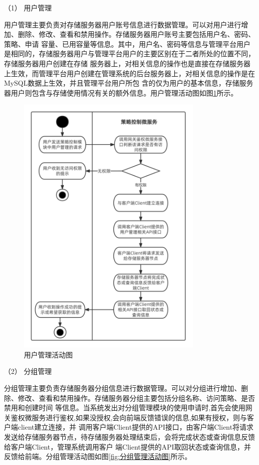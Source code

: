 （1） 用户管理

用户管理主要负责对存储服务器用户账号信息进行数据管理。可以对用户进行增加、删除、修改、查看和禁用操作。存储服务器用户账号主要包括用户名、密码、策略、申请
容量、已用容量等信息。其中，用户名、密码等信息与管理平台用户是相同的，存储服务器用户与管理平台用户的主要区别在于二者所处的位置不同，存储服务器用户创建在存储
服务器上，对相关信息的操作也是直接在存储服务器上生效，而管理平台用户创建在管理系统的后台服务器上，对相关信息的操作是在MySQL数据上生效，并且管理平台用户所包
含的仅为用户的基本信息，存储服务器用户则包含与存储使用情况有关的额外信息。用户管理活动图如图\ref{fig:用户管理活动图}所示。

\begin{figure}[htb]
    \centering
    \includegraphics[width=0.8\textwidth]{my_figures/chapter4/用户管理活动图.png}
    \caption{用户管理活动图}
    \label{fig:用户管理活动图}
\end{figure}

（2） 分组管理

分组管理主要负责存储服务器分组信息进行数据管理。可以对分组进行增加、删除、修改、查看和禁用操作。存储服务器分组主要包括分组名称、访问策略、是否禁用和创建时间
等信息。当系统发出对分组管理模块的使用申请时,首先会使用网关鉴权微服务进行鉴权,如果没授权,会向前端反馈错误的信息,如果有授权，则与客户端client建立连接，并
调用客户端Client提供的API接口，由客户端Client将请求发送给存储服务器节点，待存储服务器处理结束后，会将完成状态或查询信息反馈给客户端Client，管理系统调用客户
端Client提供的API取回状态或查询信息，并反馈给前端。分组管理活动图如图\ref{fig:分组管理活动图}所示。

